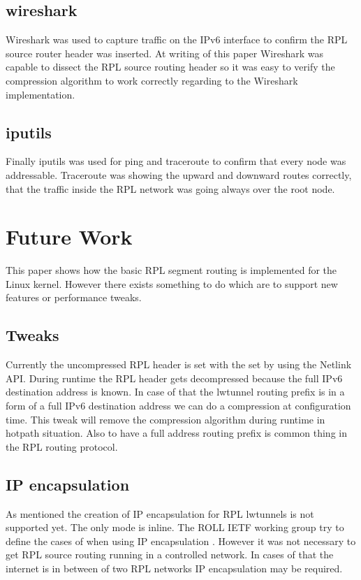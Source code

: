\documentclass[letterpaper]{article}
\begin{document}
\subsection{wireshark}

Wireshark \cite{wireshark} was used to capture traffic on the IPv6 interface to confirm the RPL source router header was inserted.
At writing of this paper Wireshark was capable to dissect the RPL source routing header so it was easy to verify the compression algorithm to work correctly regarding to the Wireshark implementation. 

\subsection{iputils}

Finally iputils \cite{iputils} was used for ping and traceroute to confirm that every node was addressable.
Traceroute was showing the upward and downward routes correctly, that the traffic inside the RPL network was going always over the root node.

\section{Future Work}

This paper shows how the basic RPL segment routing is implemented for the Linux kernel.
However there exists something to do which are to support new features or performance tweaks.

\subsection{Tweaks}

Currently the uncompressed RPL header is set with the set by using the Netlink API.
During runtime the RPL header gets decompressed because the full IPv6 destination address is known.
In case of that the lwtunnel routing prefix is in a form of a full IPv6 destination address we can do a compression at configuration time.
This tweak will remove the compression algorithm during runtime in hotpath situation.
Also to have a full address routing prefix is common thing in the RPL routing protocol.

\subsection{IP encapsulation}

As mentioned the creation of IP encapsulation for RPL lwtunnels is not supported yet.
The only mode is inline. The ROLL IETF working group try to define the cases of when using IP encapsulation \cite{I-D.ietf-roll-useofrplinfo}.
However it was not necessary to get RPL source routing running in a controlled network.
In cases of that the internet is in between of two RPL networks IP encapsulation may be required.
\end{document}
